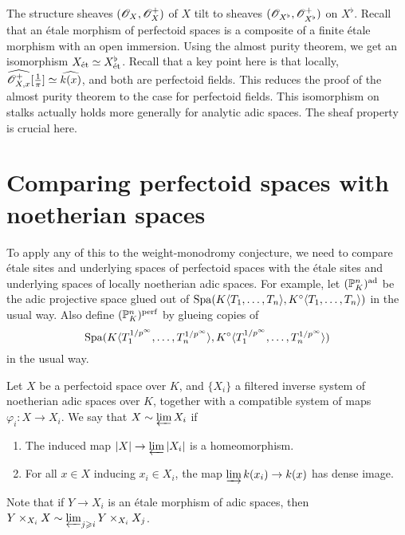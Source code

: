 \documentclass{article}
\begin{document}
The structure sheaves $(\mathscr{O}_X,\mathscr{O}_X^+)$ of $X$ tilt to sheaves 
$(\mathscr{O}_{X^\flat}, \mathscr{O}_{X^\flat}^+)$ on $X^\flat$. Recall that an \'etale 
morphism of perfectoid spaces is a composite of a finite \'etale morphism with 
an open immersion. Using the almost purity theorem, we get an isomorphism 
$X_{\textnormal{\'et}}\simeq X^\flat_{\textnormal{\'et}}$. Recall that a key point here is that locally, 
$\widehat{\mathscr{O}_{X,x}^+}[\frac 1 \pi] \simeq \widehat{k(x)}$, and both are perfectoid 
fields. This reduces the proof of the almost purity theorem to the case for 
perfectoid fields. This isomorphism on stalks actually holds more generally 
for analytic adic spaces. The sheaf property is crucial here. 





\section{Comparing perfectoid spaces with noetherian spaces}

To apply any of this to the weight-monodromy conjecture, we need to compare 
\'etale sites and underlying spaces of perfectoid spaces with the \'etale 
sites and underlying spaces of locally noetherian adic spaces. For example, 
let $(\mathbb{P}_K^n)^{\textnormal{ad}}$ be the adic projective space glued out of 
$\operatorname{Spa}(K\langle T_1,\dots,T_n\rangle,K^\circ\langle T_1,\dots,T_n\rangle)$ in 
the usual way. Also define $(\mathbb{P}_K^n)^{\textnormal{perf}}$ by glueing copies of 
\[
  \operatorname{Spa}(K\langle T_1^{1/p^\infty},\dots,T_n^{1/p^\infty}\rangle,K^\circ\langle T_1^{1/p^\infty},\dots,T_n^{1/p^\infty}\rangle)
\] 
in the usual way. 

\begin{definition}
Let $X$ be a perfectoid space over $K$, and $\{X_i\}$ a filtered inverse 
system of noetherian adic spaces over $K$, together with a compatible system 
of maps $\varphi_i :X\to X_i$. We say that $X\sim \varprojlim X_i$ if 
\begin{enumerate}
  \item The induced map $|X|\to \varprojlim |X_i|$ is a homeomorphism. 
  \item For all $x\in X$ inducing $x_i\in X_i$, the map 
    $\varinjlim k(x_i) \to k(x)$ has dense image. 
\end{enumerate}
\end{definition}

Note that if $Y\to X_i$ is an \'etale morphism of adic spaces, then 
$Y\times_{X_i} X\sim \varprojlim_{j\geqslant i} Y\times_{X_i} X_j$. 
\end{document}
